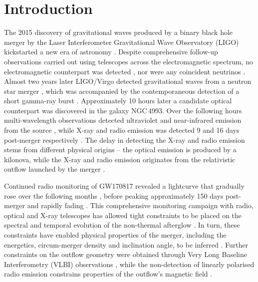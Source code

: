 \clearpage
\newpage

\section{Introduction}
The 2015 discovery of gravitational waves produced by a binary black hole merger by the Laser Interferometer Gravitational Wave Observatory (LIGO) kickstarted a new era of astronomy \citep{2016PhRvL.116f1102A}. Despite comprehensive follow-up observations carried out using telescopes across the electromagnetic spectrum, no electromagnetic counterpart was detected \citep{2016ApJ...826L..13A,2016ApJS..225....8A}, nor were any coincident neutrinos \citep{2016PhRvD..93l2010A}. Almost two years later LIGO/Virgo detected gravitational waves from a neutron star merger \citep{2017PhRvL.119p1101A}, which was accompanied by the contemporaneous detection of a short gamma-ray burst \citep[][]{2017ApJ...848L..13A,2017ApJ...848L..14G}. Approximately 10 hours later a candidate optical counterpart was discovered \citep{2017Sci...358.1556C,2017ApJ...848L..16S,2017ApJ...848L..24V,2017Natur.551...64A,2017ApJ...848L..27T,2017ApJ...850L...1L} in the galaxy NGC\,4993. Over the following hours multi-wavelength observations detected ultraviolet and near-infrared emission from the source \citep{2017ApJ...848L..12A}, while X-ray and radio emission was detected 9 and 16 days post-merger respectively \citep{2017Natur.551...71T,2017Sci...358.1579H}. The delay in detecting the X-ray and radio emission stems from different physical origins -- the optical emission is produced by a kilonova, while the X-ray and radio emission originates from the relativistic outflow launched by the merger \citep{2012ApJ...746...48M}.

Continued radio monitoring of GW170817 revealed a lightcurve that gradually rose over the following months \citep{2017ApJ...848L..21A,2018Natur.554..207M,2018ApJ...856L..18M}, before peaking approximately 150 days post-merger \citep{2018ApJ...858L..15D} and rapidly fading \citep{2018ApJ...863L..18A,2018MNRAS.478L..18T,2018ApJ...868L..11M}. This comprehensive monitoring campaign with radio, optical and X-ray telescopes has allowed tight constraints to be placed on the spectral and temporal evolution of the non-thermal afterglow \citep{2019ApJ...886L..17H,2020arXiv200602382M,2020arXiv200601150T,2020RNAAS...4...68H}. In turn, these constraints have enabled physical properties of the merger, including the energetics, circum-merger density and inclination angle, to be inferred \citep[e.g.][]{2018ApJ...867...18N}. Further constraints on the outflow geometry were obtained through Very Long Baseline Interferometry (VLBI) observations \citep{2018Natur.561..355M,2019Sci...363..968G}, while the non-detection of linearly polarised radio emission constrains properties of the outflow's magnetic field \citep{2018ApJ...861L..10C}.


